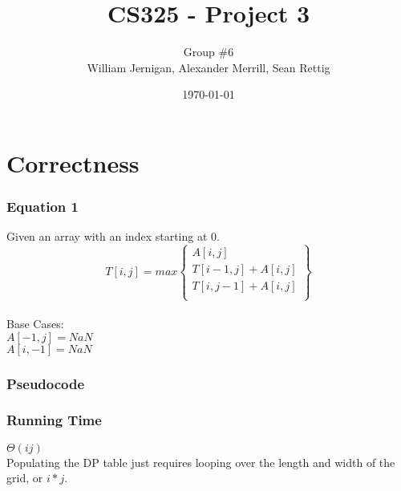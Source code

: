\documentclass{article}
\title{CS325 - Project 3}
\author{Group \#6 \\ William Jernigan, Alexander Merrill, Sean Rettig}
\date{\today}
\begin{document}
\maketitle

\part*{Correctness}
\section*{Equation 1}
Given an array with an index starting at 0.\\

\[ T[i,j] = max \left\{ \begin{array}{ll}
    A[i,j]\\
    T[i-1,j] + A[i,j]\\
    T[i,j-1] + A[i,j]\\\end{array} \right\} \] \\
Base Cases:\\
$A[-1,j] = NaN$\\
$A[i,-1] = NaN$


\section*{Pseudocode}


\section*{Running Time}
$\Theta(ij)$\\
Populating the DP table just requires looping over the length and width of the grid, or $i * j$.
\end{document}
